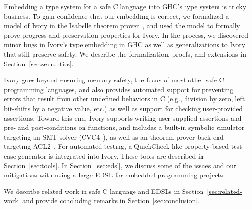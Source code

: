 Embedding a type system for a safe C language into GHC's type system is tricky
business. To gain confidence that our embedding is correct, we formalized a
model of Ivory in the Isabelle theorem prover~\cite{isabelle}, and used the model to
formally prove progress and preservation properties for Ivory. In the process,
we discovered minor bugs in Ivory's type embedding in GHC as well as
generalizations to Ivory that still preserve safety. We describe the
formalization, proofs, and extensions in Section~\ref{sec:semantics}.

Ivory goes beyond ensuring memory safety, the focus of most other safe C
programming languages, and also provides automated support for preventing errors
that result from other undefined behaviors in C (e.g., division by zero, left
bit-shifts by a negative value, etc.) as well as support for checking
user-provided assertions. Toward this end, Ivory supports writing user-supplied
assertions and pre- and post-conditions on functions, and includes a built-in
symbolic simulator targeting an SMT solver (CVC4~\cite{cvc4}), as well as an
theorem-prover back-end targeting ACL2~\cite{acl2}. For automated testing, a
QuickCheck-like property-based test-case generator is integrated into
Ivory. These tools are described in Section~\ref{sec:tools}. In
Section~\ref{sec:edsl}, we discuss some of the issues and our mitigations with
using a large EDSL for embedded programming projects.

We describe related work in safe C language and EDSLs in
Section~\ref{sec:related-work} and provide concluding remarks in
Section~\ref{sec:conclusion}.



